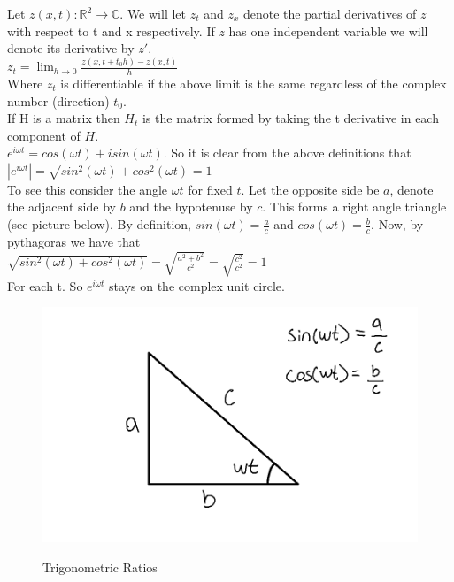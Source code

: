 \documentclass[12pt]{article}
\begin{document}
Let $z(x,t): \mathbb{R}^{2} \rightarrow \mathbb{C}$. We will let $z_{t}$ and 
$z_{x}$ denote 
the partial derivatives of $z$ with respect to t and x respectively. If $z$ has 
one independent 
variable we will denote its derivative by $z'$. \\ 

$ z_{t} = \lim_{h \to 0 } \frac{z(x,t+ t_{0}h) - z(x,t)}{h}$ \\ 

Where $z_{t}$ is differentiable if the above limit is the same regardless of 
the complex number (direction) $t_{0}$. \\

If H is a matrix then $H_{t}$ 
is the 
matrix formed by taking the t derivative in each component of $H$.\\ 

$ e^{i \omega t} = cos(\omega t) + i sin(\omega t)$. So it is clear from the 
above definitions that \\

$ |e^{i \omega t}| = \sqrt{sin^{2} (\omega t) + cos^{2} (\omega t)} =1$ \\  

To see this consider the angle $\omega t$ for fixed $t$. Let the opposite side 
be $a$, denote 
the adjacent side by $b$ and the hypotenuse by $c$. This forms a right angle 
triangle (see picture below). By definition,  $sin(\omega t) = \frac{a}{c} $ 
and $ cos(\omega t) = \frac{b}{c} $. Now, by pythagoras we have that\\

$ \sqrt{sin^{2} (\omega t) + cos^{2} (\omega t)} = 
\sqrt{\frac{a^{2}+b^{2}}{c^{2}} } = \sqrt{ \frac{c^{2}}{c^{2} } }= 1 $ \\ 

For each t. So $e^{i \omega t}$ stays on the complex unit circle. \\

\begin{figure}[h!]
	\begin{center}
		{
			\includegraphics[width=\textwidth]{pytha.png}
		} 
	\caption{Trigonometric Ratios}
	\end{center}
\end{figure}
\end{document}
